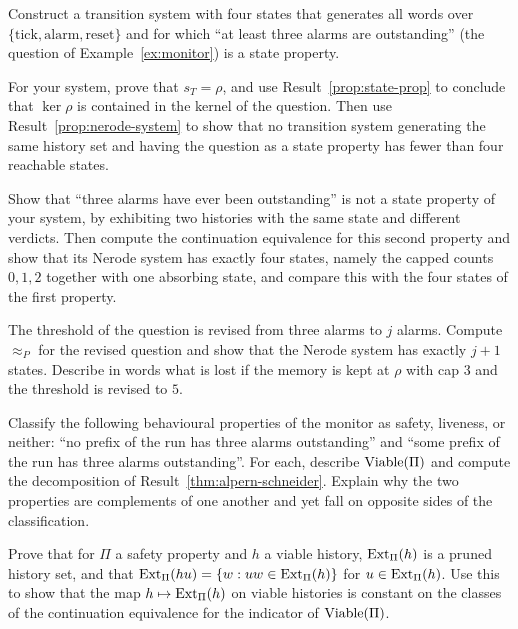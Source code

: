 \begin{exercise}
Construct a transition system with four states that generates all words over $\{\mathrm{tick},\mathrm{alarm},\mathrm{reset}\}$ and for which ``at least three alarms are outstanding'' (the question of Example~\ref{ex:monitor}) is a state property.
\end{exercise}

\begin{exercise}
For your system, prove that $s_T=\rho$, and use Result~\ref{prop:state-prop} to conclude that $\ker\rho$ is contained in the kernel of the question. Then use Result~\ref{prop:nerode-system} to show that no transition system generating the same history set and having the question as a state property has fewer than four reachable states.
\end{exercise}

\begin{exercise}
Show that ``three alarms have ever been outstanding'' is not a state property of your system, by exhibiting two histories with the same state and different verdicts. Then compute the continuation equivalence for this second property and show that its Nerode system has exactly four states, namely the capped counts $0,1,2$ together with one absorbing state, and compare this with the four states of the first property.
\end{exercise}

\begin{exercise}
The threshold of the question is revised from three alarms to $j$ alarms. Compute $\approx_P$ for the revised question and show that the Nerode system has exactly $j+1$ states. Describe in words what is lost if the memory is kept at $\rho$ with cap $3$ and the threshold is revised to $5$.
\end{exercise}

\begin{exercise}
Classify the following behavioural properties of the monitor as safety, liveness, or neither: ``no prefix of the run has three alarms outstanding'' and ``some prefix of the run has three alarms outstanding''. For each, describe $\operatorname{Viable}(\Pi)$ and compute the decomposition of Result~\ref{thm:alpern-schneider}. Explain why the two properties are complements of one another and yet fall on opposite sides of the classification.
\end{exercise}

\begin{exercise}
Prove that for $\Pi$ a safety property and $h$ a viable history, $\operatorname{Ext}_\Pi(h)$ is a pruned history set, and that $\operatorname{Ext}_\Pi(hu)=\{w: uw\in\operatorname{Ext}_\Pi(h)\}$ for $u\in\operatorname{Ext}_\Pi(h)$. Use this to show that the map $h\mapsto\operatorname{Ext}_\Pi(h)$ on viable histories is constant on the classes of the continuation equivalence for the indicator of $\operatorname{Viable}(\Pi)$.
\end{exercise}


